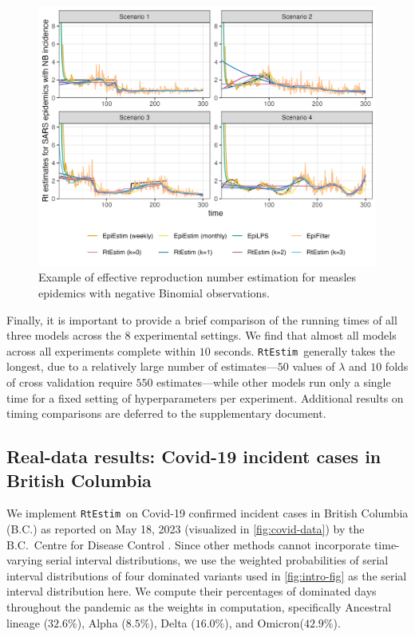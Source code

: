 \documentclass[10pt,letterpaper]{article}
\def\RtEstim{\texttt{RtEstim}}
\newcommand{\citep}[1]{\cite{#1}}
\begin{document}
\begin{figure}[!ht]
  \centering
  \includegraphics*[width=.99\textwidth]{fig/fig_res_NB_sars.png}
  \caption{Example of effective reproduction number estimation for measles epidemics with negative
  Binomial observations.}
  \label{fig:nb-est-measles}
\end{figure}

Finally, it is important to provide a brief comparison of the running times of
all three models across the $8$ experimental settings. We find that almost all
models across all experiments complete within $10$ seconds. \RtEstim\ generally
takes the longest, due to a relatively large number of estimates---$50$ values
of $\lambda$ and $10$ folds of cross validation require $550$ estimates---while
other models run only a single time for a fixed setting of hyperparameters per
experiment. Additional results on timing comparisons are deferred to the
supplementary document. 


\subsection{Real-data results: Covid-19 incident cases in British Columbia}

We implement \RtEstim\ on Covid-19 confirmed incident cases in British Columbia
(B.C.) as reported on May 18, 2023 (visualized in \autoref{fig:covid-data}) by
the B.C.\ Centre for Disease Control \citep{covidbc}. 
Since other methods cannot incorporate time-varying serial interval distributions, 
we use the weighted probabilities of serial interval distributions of four dominated variants 
used in \autoref{fig:intro-fig} as the serial interval distribution here.
We compute their percentages of dominated days throughout the pandemic as the weights in computation, 
specifically Ancestral lineage ($32.6\%$), Alpha ($8.5\%$), Delta ($16.0\%$), and Omicron($42.9\%$). 
\end{document}
